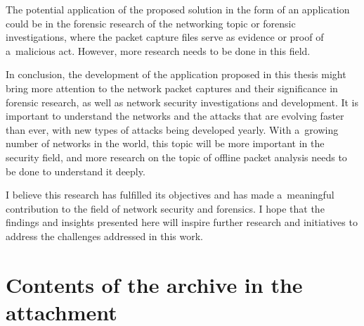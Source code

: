 \documentclass[
  printed,     %
  color,       %
  oneside,     %
  nosansbold,  %
  nocolorbold, %
  nolof,         %
  nolot,         %
]{fithesis4}
\begin{document}
The potential application of the proposed solution in the form of an application could be in the forensic research of the networking topic or forensic investigations, where the packet capture files serve as evidence or proof of a~malicious act. However, more research needs to be done in this field.

In conclusion, the development of the application proposed in this thesis might bring more attention to the network packet captures and their significance in forensic research, as well as network security investigations and development. It is important to understand the networks and the attacks that are evolving faster than ever, with new types of attacks being developed yearly. With a~growing number of networks in the world, this topic will be more important in the security field, and more research on the topic of offline packet analysis needs to be done to understand it deeply.

I believe this research has fulfilled its objectives and has made a~meaningful contribution to the field of network security and forensics. I hope that the findings and insights presented here will inspire further research and initiatives to address the challenges addressed in this work.

\appendix %
\chapter{Contents of the archive in the attachment}

\end{document}
